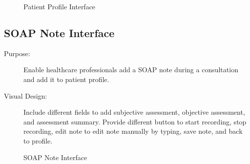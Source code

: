 \documentclass[12pt, titlepage]{article}
\begin{document}
\begin{figure}[h!]
    \centering
    \caption{Patient Profile Interface}
    \label{fig:healthcare-interface-2}
\end{figure}

\newpage{}

\subsection{SOAP Note Interface}
\begin{description}
    \item[Purpose:]Enable healthcare professionals add a SOAP note during a consultation and add it to patient profile.

    \item[Visual Design:]Include different fields to add subjective assessment, objective assessment, and assessment summary. Provide different button to start recording, stop recording, edit note to edit note manually by typing, save note, and back to profile.
    
\end{description}

\begin{figure}[h!]
    \centering
    \caption{SOAP Note Interface}
    \label{fig:healthcare-interface-3}
\end{figure}
\end{document}
